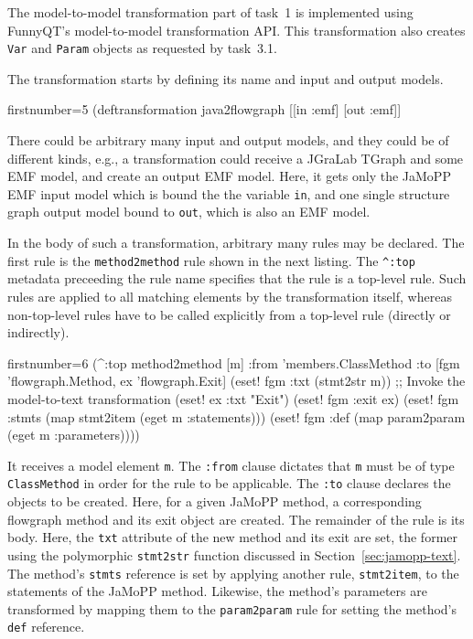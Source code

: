 \documentclass[submission]{eptcs}
\begin{document}
The model-to-model transformation part of task~1 is implemented using FunnyQT's
model-to-model transformation API.  This transformation also creates \verb|Var|
and \verb|Param| objects as requested by task~3.1.

The transformation starts by defining its name and input and output models.

\begin{clojurecode*}{firstnumber=5}
(deftransformation java2flowgraph [[in :emf] [out :emf]]
\end{clojurecode*}

There could be arbitrary many input and output models, and they could be of
different kinds, e.g., a transformation could receive a JGraLab TGraph and some
EMF model, and create an output EMF model.  Here, it gets only the JaMoPP EMF
input model which is bound the the variable \verb|in|, and one single structure
graph output model bound to \verb|out|, which is also an EMF model.

In the body of such a transformation, arbitrary many rules may be declared.
The first rule is the \verb|method2method| rule shown in the next listing.  The
\verb|^:top| metadata preceeding the rule name specifies that the rule is a
top-level rule.  Such rules are applied to all matching elements by the
transformation itself, whereas non-top-level rules have to be called explicitly
from a top-level rule (directly or indirectly).

\begin{clojurecode*}{firstnumber=6}
  (^:top method2method [m]
         :from 'members.ClassMethod
         :to [fgm 'flowgraph.Method, ex 'flowgraph.Exit]
         (eset! fgm :txt (stmt2str m)) ;; Invoke the model-to-text transformation
         (eset! ex :txt "Exit")
         (eset! fgm :exit ex)
         (eset! fgm :stmts (map stmt2item (eget m :statements)))
         (eset! fgm :def (map param2param (eget m :parameters))))
\end{clojurecode*}

It receives a model element \verb|m|.  The \verb|:from| clause dictates that
\verb|m| must be of type \verb|ClassMethod| in order for the rule to be
applicable.  The \verb|:to| clause declares the objects to be created.  Here,
for a given JaMoPP method, a corresponding flowgraph method and its exit object
are created.  The remainder of the rule is its body.  Here, the \verb|txt|
attribute of the new method and its exit are set, the former using the
polymorphic \verb|stmt2str| function discussed in
Section~\ref{sec:jamopp-text}.  The method's \verb|stmts| reference is set by
applying another rule, \verb|stmt2item|, to the statements of the JaMoPP
method.  Likewise, the method's parameters are transformed by mapping them to
the \verb|param2param| rule for setting the method's \verb|def| reference.
\end{document}
